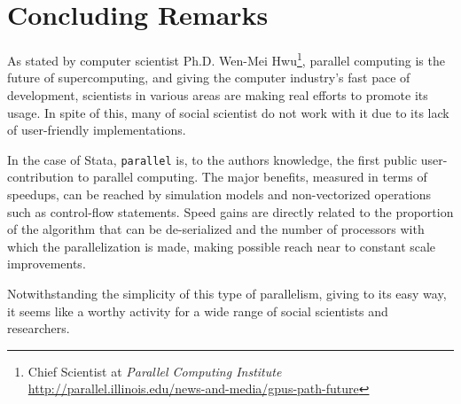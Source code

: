 \documentclass[letterpaper, 10pt]{article}
\begin{document}
\pagebreak

\section{Concluding Remarks}

As stated by computer scientist Ph.D. Wen-Mei Hwu\footnote{Chief Scientist at \emph{Parallel Computing Institute} \url{http://parallel.illinois.edu/news-and-media/gpus-path-future}}, parallel computing is the future of supercomputing, and giving the computer industry's fast pace of development, scientists in various areas are making real efforts to promote its usage. In spite of this, many of social scientist do not work with it due to its lack of user-friendly implementations.

In the case of Stata, {\tt parallel} is, to the authors knowledge, the first public user-contribution to parallel computing. The major benefits, measured in terms of speedups, can be reached by simulation models and non-vectorized operations such as control-flow statements. Speed gains are directly related to the proportion of the algorithm that can be de-serialized and the number of processors with which the parallelization is made, making possible reach near to constant scale improvements.

Notwithstanding the simplicity of this type of parallelism, giving to its easy way, it seems like a worthy activity for a wide range of social scientists and researchers.

\nocite{tierney2012,r}


\end{document}
